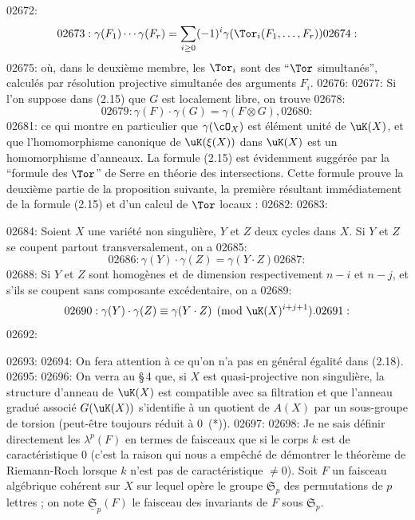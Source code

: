 02672: \begin{equation}\label{eq:2.16}
02673: \gamma(F_1) \cdots \gamma(F_r) = \sum_{i \geq 0} (-1)^i \gamma(\Tor_i(F_1, \ldots, F_r))
02674: \end{equation}
02675: o\`u, dans le deuxi\`eme membre, les $\Tor_i$ sont des ``$\Tor$ simultan\'es'', calcul\'es par r\'esolution projective simultan\'ee des arguments $F_i$.
02676: 
02677: Si l'on suppose dans (2.15) que $G$ est localement libre, on trouve
02678: \begin{equation}\label{eq:2.15bis}
02679: \gamma(F) \cdot \gamma(G) = \gamma(F \otimes G),
02680: \end{equation}
02681: ce qui montre en particulier que $\gamma(\cO_X)$ est \'el\'ement unit\'e de $\uK(X)$, et que l'homomorphisme canonique de $\uK(\xi(X))$ dans $\uK(X)$ est un homomorphisme d'anneaux. La formule (2.15) est \'evidemment sugg\'er\'ee par la ``formule des $\Tor$'' de Serre en th\'eorie des intersections. Cette formule prouve la deuxi\`eme partie de la proposition suivante, la premi\`ere r\'esultant imm\'ediatement de la formule (2.15) et d'un calcul de $\Tor$ locaux :
02682: 
02683: \begin{proposition}\label{prop:2.7}
02684: Soient $X$ une vari\'et\'e non singuli\`ere, $Y$ et $Z$ deux cycles dans $X$. Si $Y$ et $Z$ se coupent partout transversalement, on a
02685: \begin{equation}\label{eq:2.17}
02686: \gamma(Y) \cdot \gamma(Z) = \gamma(Y \cdot Z)
02687: \end{equation}
02688: Si $Y$ et $Z$ sont homog\`enes et de dimension respectivement $n - i$ et $n - j$, et s'ils se coupent sans composante exc\'edentaire, on a
02689: \begin{equation}\label{eq:2.18}
02690: \gamma(Y) \cdot \gamma(Z) \equiv \gamma(Y \cdot Z) \pmod{\uK(X)^{i+j+1}}.
02691: \end{equation}
02692: \end{proposition}
02693: 
02694: On fera attention \`a ce qu'on n'a pas en g\'en\'eral \'egalit\'e dans (2.18).
02695: 
02696: On verra au \S\,4 que, si $X$ est quasi-projective non singuli\`ere, la structure d'anneau de $\uK(X)$ est compatible avec sa filtration et que l'anneau gradu\'e associ\'e $G(\uK(X))$ s'identifie \`a un quotient de $A(X)$ par un sous-groupe de torsion (peut-\^etre toujours r\'eduit \`a $0$~(*)).
02697: 
02698: Je ne sais d\'efinir directement les $\lambda^p(F)$ en termes de faisceaux que si le corps $k$ est de caract\'eristique $0$ (c'est la raison qui nous a emp\^ech\'e de d\'emontrer le th\'eor\`eme de Riemann-Roch lorsque $k$ n'est pas de caract\'eristique $\neq 0$). Soit $F$ un faisceau alg\'ebrique coh\'erent sur $X$ sur lequel op\`ere le groupe $\mathfrak{S}_p$ des permutations de $p$ lettres ; on note $\underline{\mathfrak{S}}_p(F)$ le faisceau des invariants de $F$ sous $\mathfrak{S}_p$.
